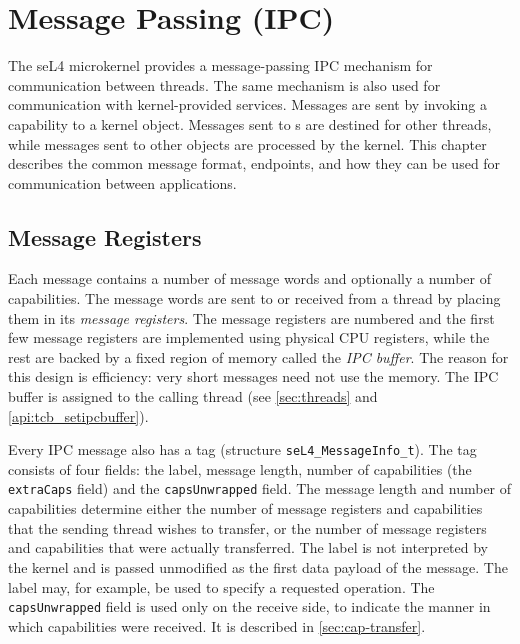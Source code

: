 %
%
%

\chapter{\label{ch:ipc}Message Passing (IPC)}

The seL4 microkernel provides a message-passing IPC mechanism for communication
between threads. The same mechanism is also used for communication with
kernel-provided services. Messages are sent by invoking a capability to a
kernel object. Messages sent to s are destined for other
threads, while messages sent to other objects are processed by the kernel. This
chapter describes the common message format, endpoints,
and how they can be used for communication between applications.

\section{Message Registers}
\label{sec:messageinfo}

Each message contains a number of message words and optionally a number of
capabilities.
The message words are sent to or received from a thread by placing them in its \emph{message registers}.
The message registers are numbered and the first few message registers are implemented
using physical CPU registers, while the rest are backed by a fixed region of
memory called the \emph{IPC buffer}.
The reason for this design is efficiency:
very short messages need not use the memory.
The IPC buffer is assigned to the calling thread (see \autoref{sec:threads} and \autoref{api:tcb_setipcbuffer}).

Every IPC message also has a tag (structure \texttt{seL4\_MessageInfo\_t}).  The
tag consists of four fields: the label, message length, number of capabilities
(the \texttt{extraCaps} field) and the \texttt{capsUnwrapped} field.  The
message length and number of capabilities determine either the number of
message registers and capabilities that the sending thread wishes to transfer,
or the number of message registers and capabilities that were actually
transferred. The label is not interpreted by the
kernel and is passed unmodified as the first data payload of the message. The
label may, for example, be used to specify a requested operation. The
\texttt{capsUnwrapped} field is used only on the receive side, to indicate the
manner in which capabilities were received. It is described in
\autoref{sec:cap-transfer}.

